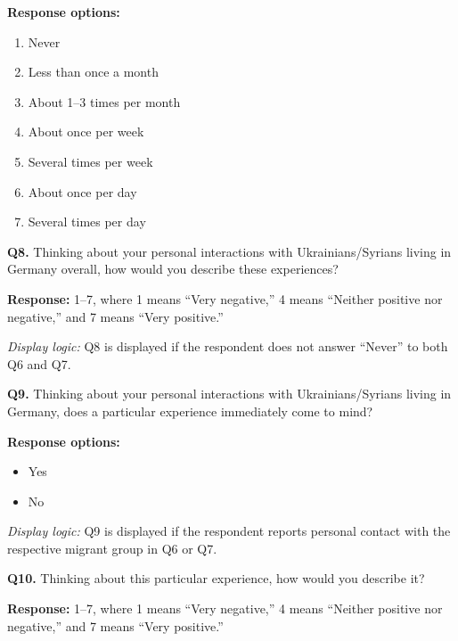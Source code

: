 \smallskip

\noindent\textbf{Response options:}

\begin{enumerate}
    \item Never
    \item Less than once a month
    \item About 1--3 times per month
    \item About once per week
    \item Several times per week
    \item About once per day
    \item Several times per day
\end{enumerate}

\medskip

\noindent\textbf{Q8.}
Thinking about your personal interactions with Ukrainians/Syrians living in
Germany overall, how would you describe these experiences?

\smallskip

\noindent\textbf{Response:} 1--7, where 1 means ``Very negative,''
4 means ``Neither positive nor negative,'' and 7 means ``Very positive.''

\smallskip

\noindent
\textit{Display logic:} Q8 is displayed if the respondent does not answer
``Never'' to both Q6 and Q7.

\medskip

\noindent\textbf{Q9.}
Thinking about your personal interactions with Ukrainians/Syrians living in
Germany, does a particular experience immediately come to mind?

\smallskip

\noindent\textbf{Response options:}

\begin{itemize}
    \item Yes
    \item No
\end{itemize}

\smallskip

\noindent
\textit{Display logic:} Q9 is displayed if the respondent reports personal
contact with the respective migrant group in Q6 or Q7.

\medskip

\noindent\textbf{Q10.}
Thinking about this particular experience, how would you describe it?

\smallskip

\noindent\textbf{Response:} 1--7, where 1 means ``Very negative,''
4 means ``Neither positive nor negative,'' and 7 means ``Very positive.''

